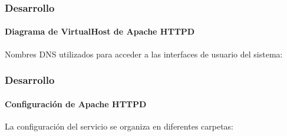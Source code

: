 \documentclass{beamer}
\begin{document}
%
%
%
%
%

\begin{frame}
\frametitle{Desarrollo}
\framesubtitle{Diagrama de VirtualHost de Apache \textup{HTTPD}}

Nombres \textup{DNS} utilizados para acceder a las interfaces de usuario del sistema:

\vspace{2em}

\centering
 {
  
 }

\end{frame}


\begin{frame}
\frametitle{Desarrollo}
\framesubtitle{Configuraci\'{o}n de Apache \textup{HTTPD}}

La configuraci\'{o}n del servicio se organiza en diferentes carpetas:

\vspace{2em}

\centering
 {
  
 }

\end{frame}
\end{document}
